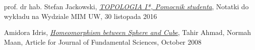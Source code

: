 \clearpage
{}
\begin{thebibliography}{9}

  prof. dr hab. Stefan Jackowski,
  \href{https://moodle.mimuw.edu.pl/pluginfile.php?file=%2F6026%2Fmod_resource%2Fcontent%2F10%2Ftopologia_star_l_2016Z.pdf}{\emph{TOPOLOGIA I*, Pomocnik studenta}},
  Notatki do wykładu na Wydziale MIM UW,
  30 listopada 2016

  Amidora Idris,
  \href{http://eprints.utm.my/10096/1/AmidoraIdris2008_HomeomorphismBetweenSphereandCube.pdf}{\emph{Homeomorphism between Sphere and Cube}},
  Tahir Ahmad, Normah Maan,
  Article for Journal of Fundamental Sciences,
  October 2008

\end{thebibliography}


